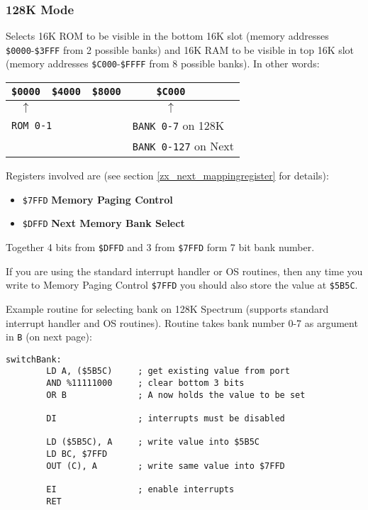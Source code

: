 \documentclass[12pt,twoside,openright,a4paper]{book}
\begin{document}
\subsubsection{128K Mode}

Selects 16K ROM to be visible in the bottom 16K slot (memory addresses {\tt \$0000}-{\tt \$3FFF} from 2 possible banks) and 16K RAM to be visible in top 16K slot (memory addresses {\tt \$C000}-{\tt \$FFFF} from 8 possible banks). In other words:

\begin{tabular}{ccccl}
	{\tt \$0000} & {\tt \$4000} & {\tt \$8000} & {\tt \$C000} & \\
	\hline
	$\uparrow$ & & & $\uparrow$ & \\
	\multicolumn{2}{l}{\tt ROM 0-1} & & \multicolumn{2}{l}{{\tt BANK 0-7} on 128K} \\
	& & & \multicolumn{2}{l}{{\tt BANK 0-127} on Next} \\
\end{tabular}

Registers involved are (see section \ref{zx_next_mappingregister} for details):

\begin{itemize}[topsep=1pt,itemsep=1pt]
	\item {\tt \$7FFD} \textbf{Memory Paging Control}
	\item {\tt \$DFFD} \textbf{Next Memory Bank Select}
\end{itemize}

Together 4 bits from {\tt \$DFFD} and 3 from {\tt \$7FFD} form 7 bit bank number.

If you are using the standard interrupt handler or OS routines, then any time you write to Memory Paging Control {\tt \$7FFD} you should also store the value at {\tt \$5B5C}.

Example routine for selecting bank on 128K Spectrum (supports standard interrupt handler and OS routines). Routine takes bank number 0-7 as argument in {\tt B} (on next page):

\begin{Verbatim}[gobble=1]
	switchBank:
		LD A, ($5B5C)     ; get existing value from port
		AND %11111000     ; clear bottom 3 bits
		OR B              ; A now holds the value to be set

		DI                ; interrupts must be disabled

		LD ($5B5C), A     ; write value into $5B5C
		LD BC, $7FFD
		OUT (C), A        ; write same value into $7FFD

		EI                ; enable interrupts
		RET
\end{Verbatim}
\end{document}
